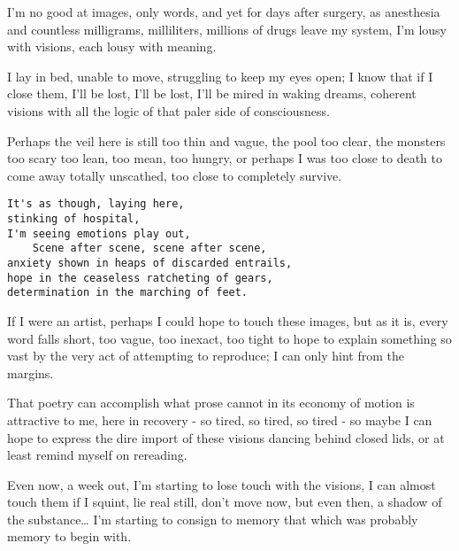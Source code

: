 I'm no good at images, only words, and yet for days after surgery, as anesthesia and countless milligrams, milliliters, millions of drugs leave my system, I'm lousy with visions, each lousy with meaning.

I lay in bed, unable to move, struggling to keep my eyes open; I know that if I close them, I'll be lost, I'll be lost, I'll be mired in waking dreams, coherent visions with all the logic of that paler side of consciousness.

Perhaps the veil here is still too thin and vague, the pool too clear, the monsters too scary too lean, too mean, too hungry, or perhaps I was too close to death to come away totally unscathed, too close to completely survive.

\begin{verbatim}
It's as though, laying here,
stinking of hospital,
I'm seeing emotions play out,
    Scene after scene, scene after scene,
anxiety shown in heaps of discarded entrails,
hope in the ceaseless ratcheting of gears,
determination in the marching of feet.
\end{verbatim}

If I were an artist, perhaps I could hope to touch these images, but as it is, every word falls short, too vague, too inexact, too tight to hope to explain something so vast by the very act of attempting to reproduce; I can only hint from the margins.

That poetry can accomplish what prose cannot in its economy of motion is attractive to me, here in recovery - so tired, so tired, so tired - so maybe I can hope to express the dire import of these visions dancing behind closed lids, or at least remind myself on rereading.

Even now, a week out, I'm starting to lose touch with the visions, I can almost touch them if I squint, lie real still, don't move now, but even then, a shadow of the substance\ldots{} I'm starting to consign to memory that which was probably memory to begin with.
